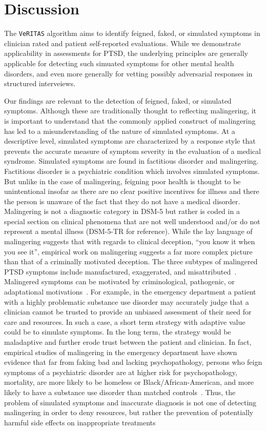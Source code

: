 \documentclass[onecolumn,10pt]{IEEEtran}
\def\vrts{\texttt{VeRITAS}\xspace}
\begin{document}
\section*{Discussion}

The  \vrts algorithm  aims to identify  feigned, faked, or simulated symptoms in clinician rated and patient self-reported evaluations. While we demonstrate applicability in assessments for PTSD, the underlying principles are generally applicable for detecting such simuated symptoms for other mental health disorders, and even more  generally for vetting possibly adversarial responses in structured interveiews.


{\color{Red1}
Our findings are relevant to the detection of feigned, faked, or simulated symptoms. Although these are traditionally thought to reflecting malingering,  it is important to understand that the commonly applied construct of malingering has led to a misunderstanding of the nature of simulated symptoms. At a descriptive level, simulated symptoms are characterized by a response style that prevents the accurate measure of symptom severity in the evaluation of a medical syndrome. Simulated symptoms are found in  factitious disorder and malingering. Factitious disorder is a psychiatric condition which involves simulated symptoms. But unlike in the case of malingering, feigning poor health is thought to be unintentional insofar as there are no clear positive incentives for illness and there the person is unaware of the fact that they do not have a medical disorder. Malingering is not a diagnostic category in DSM-5 but rather is coded in a special section on clinical phenomena that are not well understood and/or do not represent a mental illness (DSM-5-TR for reference). While the lay language of malingering suggests that with regards to clinical deception, ``you know it when you see it'', empirical work on malingering suggests a far more complex picture than that of a criminally motivated deception. The three subtypes of malingered PTSD symptoms include manufactured, exaggerated, and misattributed~\cite{resnick1984detection}. Malingered symptoms can be motivated by criminological, pathogenic, or adaptational motivations~\cite{rogers2020clinical}. For example, in the emergency department a patient with a highly problematic substance use disorder may accurately judge that a clinician cannot be trusted to provide an unbiased assessment of their need for care and resources. In such a case, a short term strategy with adaptive value could be to simulate symptoms. In the long term, the strategy would be maladaptive and further erode trust between the patient and clinician.  In fact, empirical studies of malingering in the emergency department have shown evidence that far from faking bad and lacking psychopathology, persons who feign symptoms of a psychiatric disorder are  at higher risk for psychopathology, mortality, are more likely to be homeless or Black/African-American, and more likely to have a substance use disorder than matched controls~\cite{park2021race,dell2021malingering}. Thus, the problem of simulated symptoms and inaccurate diagnosis is not one of detecting malingering in order to deny resources, but rather the prevention of potentially harmful side effects on inappropriate treatments }
\end{document}
